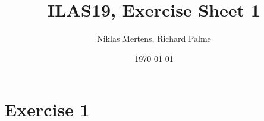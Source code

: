 \documentclass{article}
\begin{document}
\title{ILAS19, Exercise Sheet 1}
\author{Niklas Mertens, Richard Palme}
\date{\today}
\maketitle

\section*{Exercise 1}
\end{document}

